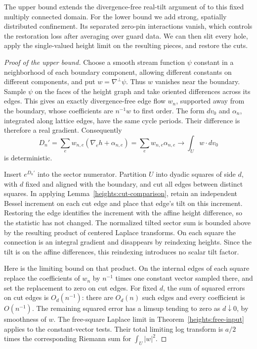The upper bound extends the divergence-free real-tilt argument of
\cite[proof of Proposition~2.6]{C} to this fixed multiply connected
domain. For the lower bound we add strong, spatially distributed
confinement. Its separated zero-pin interactions vanish, which controls
the restoration loss after averaging over guard data. We can then slit
every hole, apply the single-valued height limit on the resulting pieces,
and restore the cuts.

\begin{proof}[Proof of the upper bound]\label{sectors:upper}
Choose a smooth stream function \(\psi\) constant in a neighborhood of
each boundary component, allowing different constants on different
components, and put \(w=\nabla^\perp\psi\). Thus \(w\) vanishes near the
boundary. Sample \(\psi\) on the faces of the height graph and take
oriented differences across its edges. This gives an exactly
divergence-free edge flow \(w_n\), supported away from the boundary,
whose coefficients are \(n^{-1}w\) to first order.
The form \(dv_0\) and \(\alpha_n\), integrated along lattice edges, have
the same cycle periods. Their difference is therefore a real gradient.
Consequently
\[
 D_n'=\sum_e w_{n,e}(\nabla_e h+\alpha_{n,e})
     =\sum_e w_{n,e}\alpha_{n,e}
       \longrightarrow \int_U w\cdot dv_0
\]
is deterministic.

Insert \(e^{D_n'}\) into the sector numerator. Partition \(U\) into
dyadic squares of side \(d\), with \(d\) fixed and aligned with the
boundary, and cut all edges between distinct squares.
In applying Lemma~\ref{heights:cut-comparison}, retain an independent
Bessel increment on each cut edge and place that edge's tilt on this
increment. Restoring the edge identifies the increment with the affine
height difference, so the statistic has not changed. The normalized
tilted sector sum is bounded above by the resulting product of
centered Laplace transforms. On each square the connection is an
integral gradient and disappears by reindexing heights. Since the tilt
is on the affine differences, this reindexing introduces no scalar
tilt factor.

Here is the limiting bound on that product. On the internal edges of
each square replace the coefficients of \(w_n\) by \(n^{-1}\) times
one constant vector sampled there, and set the replacement to zero on
cut edges. For fixed \(d\), the sum of squared errors on cut edges is
\(O_d(n^{-1})\): there are \(O_d(n)\) such edges and every coefficient is
\(O(n^{-1})\). The remaining squared error has a limsup tending to zero
as \(d\downarrow0\), by smoothness of \(w\).
The free-square Laplace limit in Theorem~\ref{heights:free-input}
applies to the constant-vector tests. Their total limiting log
transform is \(a/2\) times the corresponding Riemann sum for
\(\int_U|w|^2\).


\end{proof}

